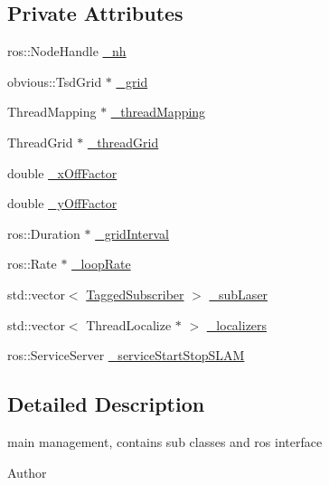 \subsection*{Private Attributes}
\begin{DoxyCompactItemize}
\item 
ros\-::\-Node\-Handle \hyperlink{classohm__tsd__slam_1_1SlamNode_ad80198ebc14aa678f72738ba64d612bc}{\-\_\-nh}
\item 
obvious\-::\-Tsd\-Grid $\ast$ \hyperlink{classohm__tsd__slam_1_1SlamNode_ae781a4fa4945e764019bf372cd6ac5ab}{\-\_\-grid}
\item 
Thread\-Mapping $\ast$ \hyperlink{classohm__tsd__slam_1_1SlamNode_a6a6b18010b78fd8fbdf67aff45613c10}{\-\_\-thread\-Mapping}
\item 
Thread\-Grid $\ast$ \hyperlink{classohm__tsd__slam_1_1SlamNode_ab0dfdeb16f4b4ef1962c749954c77e32}{\-\_\-thread\-Grid}
\item 
double \hyperlink{classohm__tsd__slam_1_1SlamNode_a794eb5cfc1ba5f68d10e034061c3aed0}{\-\_\-x\-Off\-Factor}
\item 
double \hyperlink{classohm__tsd__slam_1_1SlamNode_a275194525a13fc4400406d172a9742d4}{\-\_\-y\-Off\-Factor}
\item 
ros\-::\-Duration $\ast$ \hyperlink{classohm__tsd__slam_1_1SlamNode_aca637ee8387c2414902516f0a4e32b79}{\-\_\-grid\-Interval}
\item 
ros\-::\-Rate $\ast$ \hyperlink{classohm__tsd__slam_1_1SlamNode_ad0a9e371e33605f4a5666060949473a5}{\-\_\-loop\-Rate}
\item 
std\-::vector$<$ \hyperlink{structohm__tsd__slam_1_1TaggedSubscriber}{Tagged\-Subscriber} $>$ \hyperlink{classohm__tsd__slam_1_1SlamNode_a34d64d8aeb88f263a8f1ee5d0966f3ce}{\-\_\-sub\-Laser}
\item 
std\-::vector$<$ Thread\-Localize $\ast$ $>$ \hyperlink{classohm__tsd__slam_1_1SlamNode_a94818e8716a1ee8d83071e2bf8fb2604}{\-\_\-localizers}
\item 
ros\-::\-Service\-Server \hyperlink{classohm__tsd__slam_1_1SlamNode_aa693190f5f7afb47e0933cdc62abe488}{\-\_\-service\-Start\-Stop\-S\-L\-A\-M}
\end{DoxyCompactItemize}


\subsection{Detailed Description}
main management, contains sub classes and ros interface 

\begin{DoxyAuthor}{Author}

\end{DoxyAuthor}


